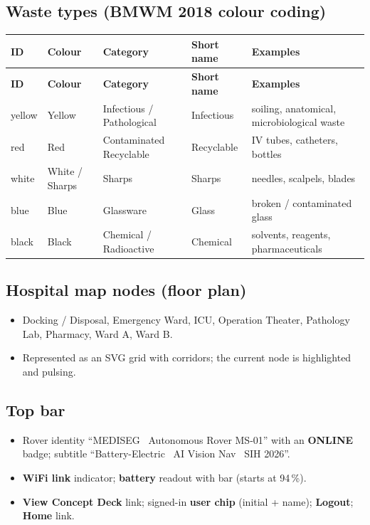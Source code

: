 \documentclass[11pt, a4paper]{article}
\begin{document}
\subsection{Waste types (BMWM 2018 colour coding)}
\label{sec:wastetypes}
\begin{longtable}{lXXXX}
  \toprule
  \textbf{ID} & \textbf{Colour} & \textbf{Category} & \textbf{Short name} & \textbf{Examples}\\
  \midrule
  \endfirsthead
  \toprule
  \textbf{ID} & \textbf{Colour} & \textbf{Category} & \textbf{Short name} & \textbf{Examples}\\
  \midrule
  \endhead
  yellow & Yellow & Infectious / Pathological & Infectious &
    soiling, anatomical, microbiological waste\\
  red & Red & Contaminated Recyclable & Recyclable &
    IV tubes, catheters, bottles\\
  white & White / Sharps & Sharps & Sharps &
    needles, scalpels, blades\\
  blue & Blue & Glassware & Glass & broken / contaminated glass\\
  black & Black & Chemical / Radioactive & Chemical &
    solvents, reagents, pharmaceuticals\\
  \bottomrule
\end{longtable}

\subsection{Hospital map nodes (floor plan)}
\label{sec:map}
\begin{itemize}[leftmargin=1.6em, itemsep=2pt]
  \item Docking / Disposal, Emergency Ward, ICU, Operation Theater,
        Pathology Lab, Pharmacy, Ward A, Ward B.
  \item Represented as an SVG grid with corridors; the current node is
        highlighted and pulsing.
\end{itemize}

\subsection{Top bar}
\begin{itemize}[leftmargin=1.6em, itemsep=2pt]
  \item Rover identity ``MEDISEG \textperiodcentered\ Autonomous Rover MS-01''
        with an \textbf{ONLINE} badge; subtitle ``Battery-Electric
        \textperiodcentered\ AI Vision Nav \textperiodcentered\ SIH 2026''.
  \item \textbf{WiFi link} indicator; \textbf{battery} readout with bar
        (starts at 94\,\%).
  \item \textbf{View Concept Deck} link; signed-in \textbf{user chip}
        (initial + name); \textbf{Logout}; \textbf{Home} link.
\end{itemize}
\end{document}
